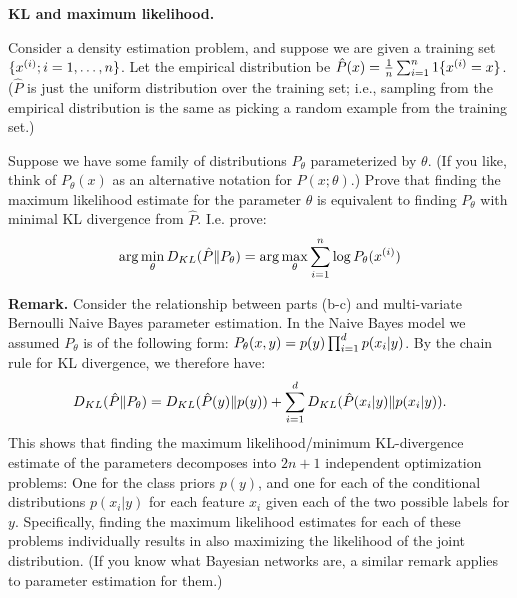 \item{} \textbf{KL and maximum likelihood.}

Consider a density estimation problem, and suppose we are given a training set $\{x^{(i)}; i=1,\ldots, {n}\}$.  Let the empirical distribution be $\hat{P}(x) = \frac{1}{{n}}\sum_{i=1}^{{n}} 1\{x^{(i)}=x\}$. ($\hat{P}$ is just the uniform distribution over the training set; i.e., sampling from the empirical distribution is the same as picking a random example from the training set.)

Suppose we have some family of distributions $P_\theta$ parameterized by $\theta$.
(If you like, think of $P_\theta(x)$ as an alternative notation for $P(x;\theta)$.)
Prove that finding the maximum likelihood estimate for the parameter $\theta$ is equivalent to finding $P_{\theta}$ with minimal KL divergence from $\hat{P}$. I.e. prove:
\[
\arg\min_\theta D_{KL}(\hat{P}\|P_\theta)
= \arg\max_\theta \sum_{i=1}^{n} \log P_\theta(x^{(i)})
\]

{\bf Remark.} Consider the relationship between parts (b-c) and multi-variate Bernoulli Naive Bayes parameter estimation. In the Naive Bayes model we assumed $P_\theta$ is of the following form: $P_{\theta}(x,y) = p(y)\prod_{i=1}^{{d}} p(x_i|y)$.  By the chain rule for KL divergence, we therefore have:
$$
D_{KL}(\hat{P}\|P_\theta)
= D_{KL}(\hat{P}(y)\|p(y)) + \sum_{i=1}^{{d}} D_{KL}(\hat{P}(x_i|y)\|p(x_i|y)).
$$
This shows that finding the maximum likelihood/minimum KL-divergence estimate of the parameters decomposes into $2n+1$ independent optimization problems: One for the class priors $p(y)$, and one for each of the conditional distributions $p(x_i|y)$ for each feature $x_i$ given each of the two possible labels for $y$.  Specifically, finding the maximum likelihood estimates for each of these problems individually results in also maximizing the likelihood of the joint distribution.  (If you know what Bayesian networks are, a similar remark applies to parameter estimation for them.)

